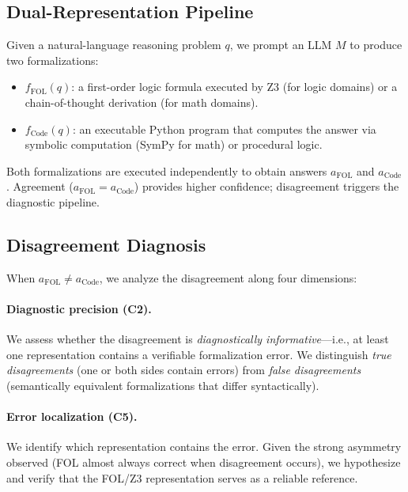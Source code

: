 \documentclass[11pt,a4paper]{article}
\begin{document}
\subsection{Dual-Representation Pipeline}
\label{sec:pipeline}

Given a natural-language reasoning problem $q$, we prompt an LLM $M$ to produce two formalizations:
\begin{itemize}
\item $f_{\text{FOL}}(q)$: a first-order logic formula executed by Z3 (for logic domains) or a chain-of-thought derivation (for math domains).
\item $f_{\text{Code}}(q)$: an executable Python program that computes the answer via symbolic computation (SymPy for math) or procedural logic.
\end{itemize}

Both formalizations are executed independently to obtain answers $a_{\text{FOL}}$ and $a_{\text{Code}}$. Agreement ($a_{\text{FOL}} = a_{\text{Code}}$) provides higher confidence; disagreement triggers the diagnostic pipeline.

\subsection{Disagreement Diagnosis}
\label{sec:diagnosis}

When $a_{\text{FOL}} \neq a_{\text{Code}}$, we analyze the disagreement along four dimensions:

\paragraph{Diagnostic precision (C2).} We assess whether the disagreement is \emph{diagnostically informative}---i.e., at least one representation contains a verifiable formalization error. We distinguish \emph{true disagreements} (one or both sides contain errors) from \emph{false disagreements} (semantically equivalent formalizations that differ syntactically).

\paragraph{Error localization (C5).} We identify which representation contains the error. Given the strong asymmetry observed (FOL almost always correct when disagreement occurs), we hypothesize and verify that the FOL/Z3 representation serves as a reliable reference.
\end{document}
